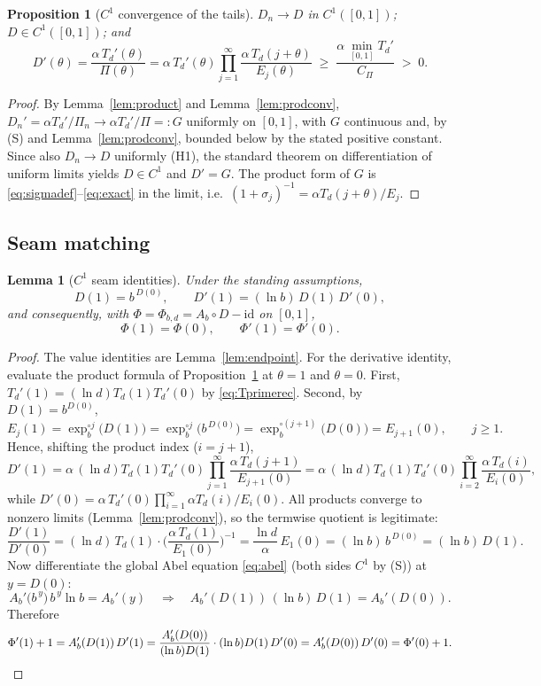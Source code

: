 \documentclass[11pt]{article}
\newtheorem{lemma}[theorem]{Lemma}
\newtheorem{proposition}[theorem]{Proposition}
\theoremstyle{definition}
\theoremstyle{remark}
\newcommand{\Ab}{A_{b}}
\newcommand{\Td}{T_{d}}
\newcommand{\expb}{\exp_{b}}
\begin{document}
\begin{proposition}[$C^{1}$ convergence of the tails]\label{prop:C1conv}
$D_n\to D$ in $C^{1}([0,1])$; $D\in C^{1}([0,1])$; and
\[
D'(\theta)=\frac{\alpha\,\Td'(\theta)}{\Pi(\theta)}
=\alpha\,\Td'(\theta)\prod_{j=1}^{\infty}
\frac{\alpha\,\Td(j+\theta)}{E_j(\theta)}
\;\ge\;\frac{\alpha\,\min_{[0,1]}\Td'}{C_\Pi}\;>\;0 .
\]
\end{proposition}

\begin{proof}
By Lemma~\ref{lem:product} and Lemma~\ref{lem:prodconv},
$D_n'=\alpha\Td'/\Pi_n\to\alpha\Td'/\Pi=:G$ uniformly on $[0,1]$, with $G$
continuous and, by (S) and Lemma~\ref{lem:prodconv}, bounded below by the
stated positive constant. Since also $D_n\to D$ uniformly (H1), the
standard theorem on differentiation of uniform limits
\cite[Thm.~7.17]{Rudin} yields $D\in C^{1}$ and $D'=G$. The product form
of $G$ is \eqref{eq:sigmadef}--\eqref{eq:exact} in the limit, i.e.\
$(1+\sigma_j)^{-1}=\alpha\Td(j+\theta)/E_j$.
\end{proof}

\subsection{Seam matching}

\begin{lemma}[$C^{1}$ seam identities]\label{lem:seam}
Under the standing assumptions,
\[
D(1)=b^{\,D(0)},\qquad
D'(1)=(\ln b)\,D(1)\,D'(0),
\]
and consequently, with $\Phi=\Phi_{b,d}=\Ab\circ D-\mathrm{id}$ on $[0,1]$,
\[
\Phi(1)=\Phi(0),
\qquad
\Phi'(1)=\Phi'(0).
\]
\end{lemma}

\begin{proof}
The value identities are Lemma~\ref{lem:endpoint}. For the derivative
identity, evaluate the product formula of
Proposition~\ref{prop:C1conv} at $\theta=1$ and $\theta=0$. First,
$\Td'(1)=(\ln d)\Td(1)\Td'(0)$ by \eqref{eq:Tprimerec}. Second, by
$D(1)=b^{D(0)}$,
\[
E_j(1)=\expb^{\circ j}\big(D(1)\big)
=\expb^{\circ j}\big(b^{\,D(0)}\big)
=\expb^{\circ(j+1)}\big(D(0)\big)
=E_{j+1}(0),
\qquad j\ge 1 .
\]
Hence, shifting the product index ($i=j+1$),
\[
D'(1)=\alpha\,(\ln d)\Td(1)\Td'(0)
\prod_{j=1}^{\infty}\frac{\alpha\,\Td(j+1)}{E_{j+1}(0)}
=\alpha\,(\ln d)\Td(1)\Td'(0)
\prod_{i=2}^{\infty}\frac{\alpha\,\Td(i)}{E_{i}(0)} ,
\]
while $D'(0)=\alpha\,\Td'(0)\prod_{i=1}^{\infty}\alpha\Td(i)/E_i(0)$.
All products converge to nonzero limits (Lemma~\ref{lem:prodconv}), so
the termwise quotient is legitimate:
\[
\frac{D'(1)}{D'(0)}
=(\ln d)\,\Td(1)\cdot\Big(\frac{\alpha\,\Td(1)}{E_1(0)}\Big)^{-1}
=\frac{\ln d}{\alpha}\,E_1(0)
=(\ln b)\,b^{\,D(0)}
=(\ln b)\,D(1).
\]
Now differentiate the global Abel equation \eqref{eq:abel} (both sides
$C^{1}$ by (S)) at $y=D(0)$:
\[
\Ab'\big(b^{\,y}\big)\,b^{\,y}\ln b=\Ab'(y)
\quad\Longrightarrow\quad
\Ab'(D(1))\,(\ln b)\,D(1)=\Ab'(D(0)) .
\]
Therefore
\[
\Phi'(1)+1=\Ab'(D(1))\,D'(1)
=\frac{\Ab'(D(0))}{(\ln b)D(1)}\cdot(\ln b)D(1)\,D'(0)
=\Ab'(D(0))\,D'(0)=\Phi'(0)+1 .
\qedhere
\]
\end{proof}
\end{document}
